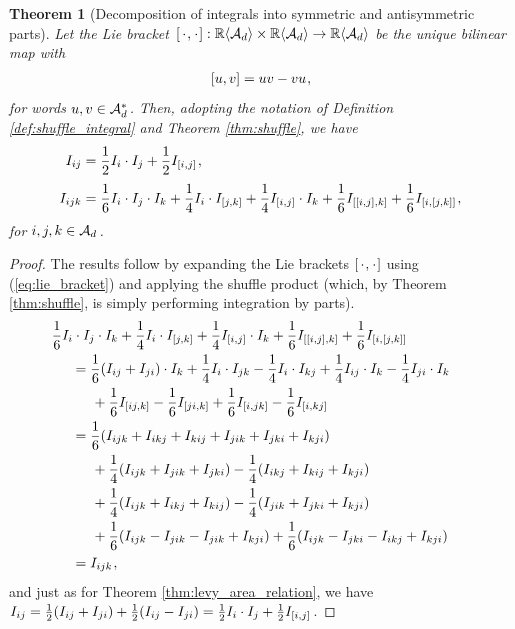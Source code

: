 \documentclass[sn-mathphys-num]{sn-jnl}%
\newtheorem{theorem}{Theorem}%
\newcommand{\R}{\mathbb{R}}
\newcommand{\m}{\hspace{0.25mm}}
\newcommand{\mm}{\hspace{5mm}}
\begin{document}
\begin{theorem}[Decomposition of integrals into symmetric and antisymmetric parts]
\label{thm:symmetric_antisymmetric}
Let the Lie bracket $\m[\,\cdot\m,\m\cdot\m] : \R\langle\mathcal{A}_d\rangle\times \R\langle\mathcal{A}_d\rangle\rightarrow \R\langle\mathcal{A}_d\rangle$ be the unique bilinear map with
\begin{align}\label{eq:lie_bracket}
[u, v] = uv - vu\m,
\end{align}
for words $u,v\in \mathcal{A}_d^\ast\m$. Then, adopting the notation of Definition \ref{def:shuffle_integral} and Theorem \ref{thm:shuffle}, we have
\begin{align}
I_{ij} & = \frac{1}{2}I_i\cdot I_j + \frac{1}{2}I_{[i,j]}\m,\label{eq:ij_symmetric_antisymmetric}\\[3pt]
I_{ijk} & = \frac{1}{6}I_i\cdot I_j\cdot I_k 
    + \frac{1}{4} I_i\cdot I_{[j,k]} 
    + \frac{1}{4} I_{[i,j]}\cdot I_k 
    + \frac{1}{6} I_{[[i,j], k]} 
    + \frac{1}{6} I_{[i,[j,k]]} \m,\label{eq:ijk_symmetric_antisymmetric}
\end{align}
for $i,j,k\in\mathcal{A}_d\m$.
\end{theorem}
\begin{proof} The results follow by expanding the Lie brackets $[\,\cdot\m,\m\cdot\m]$ using (\ref{eq:lie_bracket}) and applying the shuffle product (which, by Theorem \ref{thm:shuffle}, is simply performing integration by parts).
\begin{align*}
&\hspace{-5mm}\frac{1}{6}I_i\cdot I_j\cdot I_k + \frac{1}{4} I_i\cdot I_{[j,k]} + \frac{1}{4} I_{[i,j]}\cdot I_k + \frac{1}{6} I_{[[i,j], k]} + \frac{1}{6} I_{[i,[j,k]]}\\
& = \frac{1}{6}(I_{ij} + I_{ji})\cdot I_k + \frac{1}{4}I_i\cdot I_{jk} - \frac{1}{4}I_i\cdot I_{kj} + \frac{1}{4} I_{ij}\cdot I_k -  \frac{1}{4} I_{ji}\cdot I_k\\
&\mm + \frac{1}{6} I_{[ij, k]} - \frac{1}{6} I_{[ji, k]} + \frac{1}{6} I_{[i,jk]} - \frac{1}{6} I_{[i,kj]}\\
& = \frac{1}{6}(I_{ijk} + I_{ikj} + I_{kij} + I_{jik} + I_{jki} + I_{kji})\\
&\mm + \frac{1}{4}(I_{ijk} + I_{jik} + I_{jki}) - \frac{1}{4}(I_{ikj} + I_{kij} + I_{kji})\\
&\mm + \frac{1}{4}(I_{ijk} + I_{ikj} + I_{kij}) - \frac{1}{4}(I_{jik} + I_{jki} + I_{kji})\\
&\mm + \frac{1}{6}(I_{ijk} - I_{jik} - I_{jik} + I_{kji}) + \frac{1}{6}(I_{ijk} - I_{jki} - I_{ikj} + I_{kji})\\
& = I_{ijk}\m,
\end{align*}
and just as for Theorem \ref{thm:levy_area_relation}, we have $I_{ij} = \frac{1}{2}(I_{ij} + I_{ji}) + \frac{1}{2}(I_{ij} - I_{ji}) = \frac{1}{2}I_i\cdot I_j + \frac{1}{2}I_{[i,j]}\m$.
\end{proof}
\end{document}
